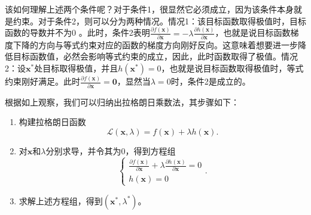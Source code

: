 该如何理解上述两个条件呢？对于条件1，很显然它必须成立，因为该条件本身就是约束。对于条件2，则可以分为两种情况。情况1：该目标函数取得极值时，目标函数的导数并不为0 。此时，条件2表明\( \frac{\partial f(\bm{x})}{\partial \bm{x}} = -\lambda \frac{\partial h(\bm{x})}{\partial \bm{x}}  \)，也就是说目标函数梯度下降的方向与等式约束对应的函数的梯度方向刚好反向。这意味着想要进一步降低目标函数值，必然会影响等式约束的成立，因此，此时函数取得了极值。情况2：设\( \bm{x}^* \)处目标取得极值，并且\( h(\bm{x}^*) = 0\)，也就是说目标函数取得极值时，等式约束刚好满足。此时\( \frac{\partial f(\bm{x})}{\partial \bm{x}} = \bm{0} \)，显然当\( \lambda = 0 \)时，条件2是成立的。

根据如上观察，我们可以归纳出拉格朗日乘数法，其步骤如下：
\begin{enumerate}
    \item 构建拉格朗日函数
          \[
              \mathcal{L}(\bm{x}, \lambda) = f(\bm{x}) + \lambda h(\bm{x}).
          \]
    \item 对\( \bm{x} \)和\( \lambda \)分别求导，并令其为0，得到方程组
          \[
              \begin{cases}
                  \frac{\partial f(\bm{x})}{\partial \bm{x}} + \lambda \frac{\partial h(\bm{x})}{\partial \bm{x}} = 0 \\
                  h(\bm{x}) = 0
              \end{cases}.
          \]
    \item 求解上述方程组，得到\( (\bm{x}^*,\lambda^*)\)。
\end{enumerate}

